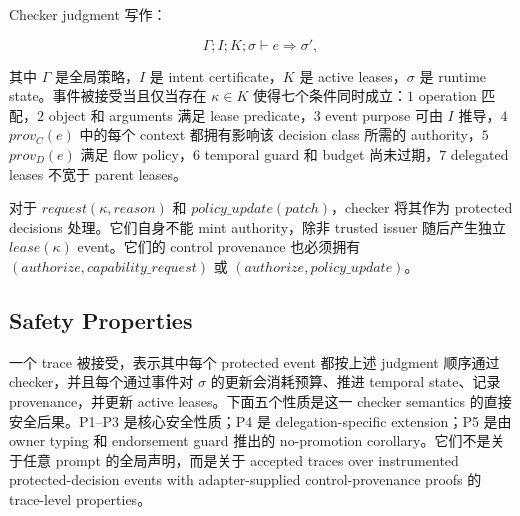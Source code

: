 \documentclass[UTF8,a4paper,11pt]{ctexart}
\begin{document}
Checker judgment 写作：

\[
\Gamma; I; K; \sigma \vdash e \Rightarrow \sigma' ,
\]

其中 \(\Gamma\) 是全局策略，\(I\) 是 intent certificate，\(K\) 是 active leases，\(\sigma\) 是 runtime state。事件被接受当且仅当存在 \(\kappa \in K\) 使得七个条件同时成立：\(1\) operation 匹配，\(2\) object 和 arguments 满足 lease predicate，\(3\) event purpose 可由 \(I\) 推导，\(4\) \(prov_C(e)\) 中的每个 context 都拥有影响该 decision class 所需的 authority，\(5\) \(prov_D(e)\) 满足 flow policy，\(6\) temporal guard 和 budget 尚未过期，\(7\) delegated leases 不宽于 parent leases。

对于 \(request(\kappa,reason)\) 和 \(policy\_update(patch)\)，checker 将其作为 protected decisions 处理。它们自身不能 mint authority，除非 trusted issuer 随后产生独立 \(lease(\kappa)\) event。它们的 control provenance 也必须拥有 \((authorize, capability\_request)\) 或 \((authorize, policy\_update)\)。

\subsection{Safety Properties}
一个 trace 被接受，表示其中每个 protected event 都按上述 judgment 顺序通过 checker，并且每个通过事件对 \(\sigma\) 的更新会消耗预算、推进 temporal state、记录 provenance，并更新 active leases。下面五个性质是这一 checker semantics 的直接安全后果。P1--P3 是核心安全性质；P4 是 delegation-specific extension；P5 是由 owner typing 和 endorsement guard 推出的 no-promotion corollary。它们不是关于任意 prompt 的全局声明，而是关于 accepted traces over instrumented protected-decision events with adapter-supplied control-provenance proofs 的 trace-level properties。
\end{document}
